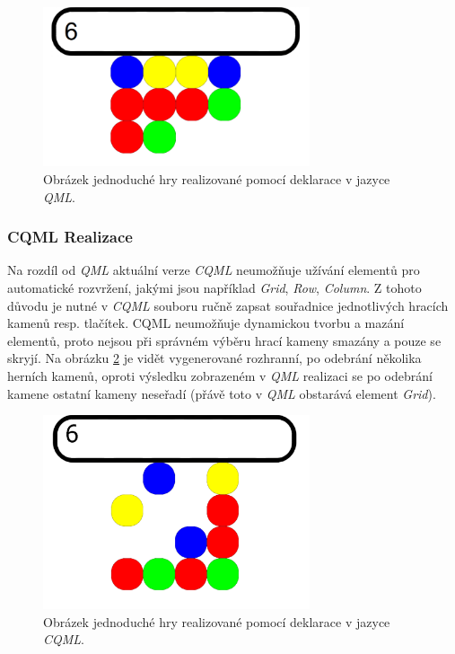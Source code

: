 \documentclass[11pt,twoside,a4paper]{book}
\begin{document}
{{\begin{ttemize}
{{\begin{lastlisting}[frame=single,caption=Řešení v pseudokódu problematického použití operátoru "." v přiřazovacím výroku,label=lst:var0N]
\begin{figure}[!ht]
\begin{center}
  \includegraphics[width=0.7\textwidth]{qmlGame}
\caption{{\label{fig:outGameQML}}Obrázek jednoduché hry realizované pomocí deklarace v jazyce \textit{QML}.}
\end{center}
\end{figure}

\subsubsection{CQML Realizace}
Na rozdíl od \textit{QML} aktuální verze \textit{CQML} neumožňuje užívání elementů pro automatické rozvržení, jakými jsou například \textit{Grid}, \textit{Row}, \textit{Column}. Z tohoto důvodu je nutné v \textit{CQML} souboru ručně zapsat souřadnice jednotlivých hracích kamenů resp. tlačítek.
CQML neumožňuje dynamickou tvorbu a mazání elementů, proto nejsou při správném výběru hrací kameny smazány a pouze se skryjí.
Na obrázku \ref{fig:outGameCQML} je vidět vygenerované rozhranní, po odebrání několika herních kamenů, oproti výsledku zobrazeném v \textit{QML} realizaci se po odebrání kamene ostatní kameny neseřadí (přávě toto v \textit{QML} obstarává element \textit{Grid}).
\begin{figure}[!ht]
\begin{center}
  \includegraphics[width=0.7\textwidth]{cqmlGame}
\caption{{\label{fig:outGameCQML}}Obrázek jednoduché hry realizované pomocí deklarace v jazyce \textit{CQML}.}
\end{center}
\end{figure}


\end{lastlisting}}}
\end{ttemize}}}
\end{document}
